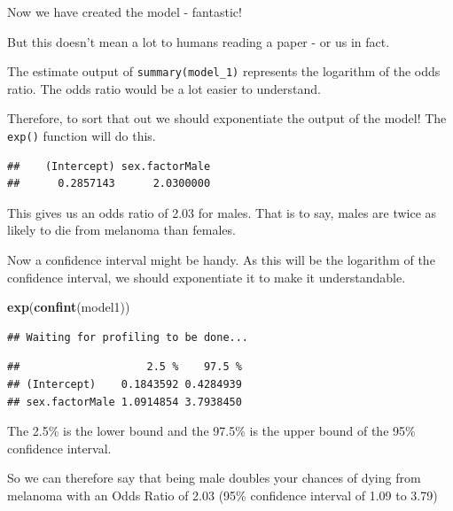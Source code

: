 \documentclass[12pt,]{krantz}
\makeatletter
\newenvironment{Shaded}{\begin{snugshade}}{\end{snugshade}}
\newcommand{\KeywordTok}[1]{\textcolor[rgb]{0.13,0.29,0.53}{\textbf{#1}}}
\newcommand{\NormalTok}[1]{#1}
\newcommand{\OperatorTok}[1]{\textcolor[rgb]{0.81,0.36,0.00}{\textbf{#1}}}
\newenvironment{kframe}{%
\medskip{}
\setlength{\fboxsep}{.8em}
 \def\at@end@of@kframe{}%
 \ifinner\ifhmode%
  \def\at@end@of@kframe{\end{minipage}}%
  \begin{minipage}{\columnwidth}%
 \fi\fi%
 \def\FrameCommand##1{\hskip\@totalleftmargin \hskip-\fboxsep
 \colorbox{shadecolor}{##1}\hskip-\fboxsep
     \hskip-\linewidth \hskip-\@totalleftmargin \hskip\columnwidth}%
 \MakeFramed {\advance\hsize-\width
   \@totalleftmargin\z@ \linewidth\hsize
   \@setminipage}}%
 {\par\unskip\endMakeFramed%
 \at@end@of@kframe}
\renewenvironment{Shaded}{\begin{kframe}}{\end{kframe}}
\theoremstyle{definition}
\theoremstyle{definition}
\theoremstyle{definition}
\theoremstyle{remark}
\makeatother
\begin{document}
Now we have created the model - fantastic!

But this doesn't mean a lot to humans reading a paper - or us in fact.

The estimate output of \texttt{summary(model\_1)} represents the
logarithm of the odds ratio. The odds ratio would be a lot easier to
understand.

Therefore, to sort that out we should exponentiate the output of the
model! The \texttt{exp()} function will do this.

\begin{Shaded}
\end{Shaded}

\begin{verbatim}
##    (Intercept) sex.factorMale 
##      0.2857143      2.0300000
\end{verbatim}

This gives us an odds ratio of 2.03 for males. That is to say, males are
twice as likely to die from melanoma than females.

Now a confidence interval might be handy. As this will be the logarithm
of the confidence interval, we should exponentiate it to make it
understandable.

\begin{Shaded}
\begin{Highlighting}[]
\KeywordTok{exp}\NormalTok{(}\KeywordTok{confint}\NormalTok{(model1))}
\end{Highlighting}
\end{Shaded}

\begin{verbatim}
## Waiting for profiling to be done...
\end{verbatim}

\begin{verbatim}
##                    2.5 %    97.5 %
## (Intercept)    0.1843592 0.4284939
## sex.factorMale 1.0914854 3.7938450
\end{verbatim}

The 2.5\% is the lower bound and the 97.5\% is the upper bound of the
95\% confidence interval.

So we can therefore say that being male doubles your chances of dying
from melanoma with an Odds Ratio of 2.03 (95\% confidence interval of
1.09 to 3.79)
\end{document}
